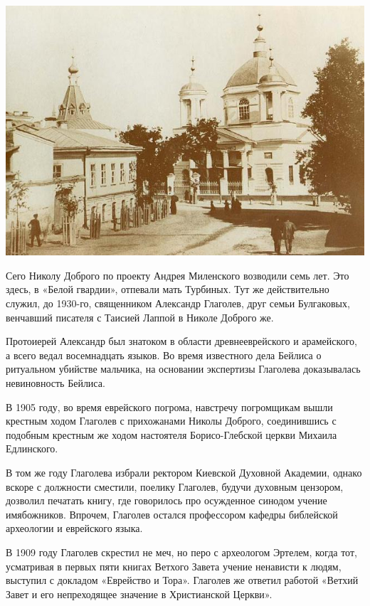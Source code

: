 \begin{center}
\includegraphics[width=\linewidth]{chast-colebanie-osnov/borichev-tok/nikola_dobry.jpg}
\end{center}

Сего Николу Доброго по проекту Андрея Миленского возводили семь лет. Это здесь, в «Белой гвардии», отпевали мать Турбиных. Тут же действительно служил, до 1930-го, священником Александр Глаголев, друг семьи Булгаковых, венчавший писателя с Таисией Лаппой в Николе Доброго же.

Протоиерей Александр был знатоком в области древнееврейского и арамейского, а всего  ведал восемнадцать языков. Во время известного дела Бейлиса о ритуальном убийстве мальчика, на основании экспертизы Глаголева доказывалась невиновность Бейлиса. 

В 1905 году, во время еврейского погрома, навстречу погромщикам вышли крестным ходом Глаголев с прихожанами Николы Доброго, соединившись с подобным крестным же ходом настоятеля Борисо-Глебской церкви Михаила Едлинского.

В том же году Глаголева избрали ректором Киевской Духовной Академии, однако вскоре с должности сместили, поелику Глаголев, будучи духовным цензором, дозволил печатать книгу, где говорилось про осужденное синодом учение имябожников. Впрочем, Глаголев остался профессором кафедры библейской археологии и еврейского языка.

В 1909 году Глаголев скрестил не меч, но перо с археологом Эртелем, когда тот, усматривая в первых пяти книгах Ветхого Завета учение ненависти к людям, выступил с докладом «Еврейство и Тора». Глаголев же ответил работой «Ветхий Завет и его непреходящее значение в Христианской Церкви».

